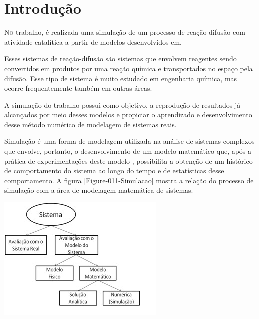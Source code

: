 
\section{Introdução}

\lettrine{N}{o} trabalho, é realizada uma simulação de um processo de
reação-difusão com atividade catalítica a partir de modelos desenvolvidos
em\cite{3}.

Esses sistemas de reação-difusão são sistemas que envolvem reagentes sendo
convertidos em produtos por uma reação química e transportados no espaço pela
difusão. Esse tipo de sistema é muito estudado em engenharia química, mas ocorre
frequentemente também em outras áreas\cite{4}.

A simulação do trabalho possui como objetivo, a reprodução de resultados já
alcançados por meio desses modelos e propiciar o aprendizado e desenvolvimento
desse método numérico de modelagem de sistemas reais.

Simulação é uma forma de modelagem utilizada na análise de sistemas complexos
que envolve, portanto, o desenvolvimento de um modelo matemático que, após a
prática de experimentações deste modelo , possibilita a obtenção de um histórico
de comportamento do sistema ao longo do tempo e de estatísticas desse
comportamento\cite{1}. A figura \ref{Figure-011-Simulacao} mostra a relação do
processo de simulação com a área de modelagem matemática de sistemas.

{ \centering
	\hfill \break
	\captionsetup{type=figure}
	\includegraphics[width=\columnwidth]{./figures/011-Simulacao.jpg}
	\label{Figure-011-Simulacao}
}

